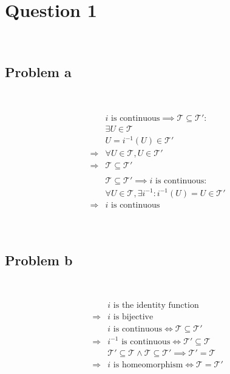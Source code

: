 \documentclass{article}
\begin{document}
\section*{Question 1}

~

\subsection*{Problem a}

~

\begin{equation*}
    \begin{split}
        &i\text{ is continuous}\implies \mathcal{T} \subseteq\mathcal{T} ':\\
        &\exists U\in \mathcal{T} \\
        &U=i^{-1}(U)\in\mathcal{T}' \\
        \Rightarrow&\forall U\in\mathcal{T} ,U\in\mathcal{T} '\\
        \Rightarrow&\mathcal{T} \subseteq\mathcal{T} '\\
        &\\
        &\mathcal{T} \subseteq\mathcal{T} '\implies i\text{ is continuous}:\\
        &\forall U\in \mathcal{T} ,\exists i^{-1}:i^{-1}(U)=U\in\mathcal{T} '\\
        \Rightarrow&i\text{ is continuous}\\
    \end{split}
\end{equation*}

~

\subsection*{Problem b}

~

\begin{equation*}
    \begin{split}
        &i\text{ is the identity function}\\
        \Rightarrow&i\text{ is bijective}\\
        &i\text{ is continuous}\Leftrightarrow \mathcal{T} \subseteq \mathcal{T} '\\
        \Rightarrow&i^{-1}\text{ is continuous}\Leftrightarrow \mathcal{T}' \subseteq \mathcal{T} \\
        &\mathcal{T}' \subseteq \mathcal{T}\land\mathcal{T} \subseteq \mathcal{T} '\implies\mathcal{T}' = \mathcal{T}\\
        \Rightarrow&i\text{ is homeomorphism} \Leftrightarrow \mathcal{T} = \mathcal{T} '\\
    \end{split}
\end{equation*}
\end{document}
